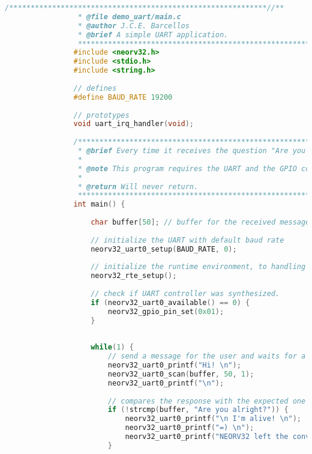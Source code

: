             \begin{lstlisting}[style=mystyle_c, language=c, breaklines]
                /************************************************************//**
                 * @file demo_uart/main.c
                 * @author J.C.E. Barcellos
                 * @brief A simple UART application.
                 ***************************************************************/
                #include <neorv32.h>
                #include <stdio.h>
                #include <string.h>
                
                // defines
                #define BAUD_RATE 19200
                
                // prototypes
                void uart_irq_handler(void);
                
                /************************************************************//**
                 * @brief Every time it receives the question "Are you alright?" it will respond with "I'm alive".
                 *
                 * @note This program requires the UART and the GPIO controller to be synthesized.
                 *
                 * @return Will never return.
                 ***************************************************************/
                int main() {
                
                    char buffer[50]; // buffer for the received message
                
                    // initialize the UART with default baud rate
                    neorv32_uart0_setup(BAUD_RATE, 0);
                
                    // initialize the runtime environment, to handling all CPU's traps
                    neorv32_rte_setup();
                
                    // check if UART controller was synthesized.
                    if (neorv32_uart0_available() == 0) {
                        neorv32_gpio_pin_set(0x01);
                    }
                
                
                    while(1) {
                        // send a message for the user and waits for a response
                        neorv32_uart0_printf("Hi! \n");
                        neorv32_uart0_scan(buffer, 50, 1);
                        neorv32_uart0_printf("\n");
                
                        // compares the response with the expected one
                        if (!strcmp(buffer, "Are you alright?")) {
                            neorv32_uart0_printf("\n I'm alive! \n");
                            neorv32_uart0_printf("=) \n");
                            neorv32_uart0_printf("NEORV32 left the conversation... \n");
                        }
                

\end{lstlisting}
